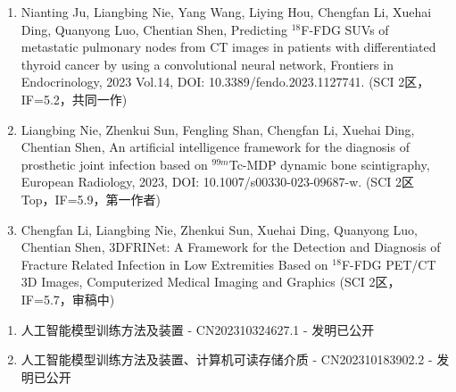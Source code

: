 \begin{publications}
    \begin{enumerate}
        \item Nianting Ju, Liangbing Nie, Yang Wang, Liying Hou, Chengfan Li, Xuehai Ding, Quanyong Luo, Chentian Shen, Predicting \(^{18}\)F-FDG SUVs of metastatic pulmonary nodes from CT images in patients with differentiated thyroid cancer by using a convolutional neural network, Frontiers in Endocrinology, 2023 Vol.14, DOI: 10.3389/fendo.2023.1127741. (SCI 2区，IF=5.2，共同一作)
        \item Liangbing Nie, Zhenkui Sun, Fengling Shan, Chengfan Li, Xuehai Ding, Chentian Shen, An artificial intelligence framework for the diagnosis of prosthetic joint infection based on \(^{99m}\)Tc-MDP dynamic bone scintigraphy, European Radiology, 2023, DOI: 10.1007/s00330-023-09687-w. (SCI 2区 Top，IF=5.9，第一作者)
        \item Chengfan Li, Liangbing Nie, Zhenkui Sun, Xuehai Ding, Quanyong Luo, Chentian Shen, 3DFRINet: A Framework for the Detection and Diagnosis of Fracture Related Infection in Low Extremities Based on \(^{18}\)F-FDG PET/CT 3D Images, Computerized Medical Imaging and Graphics (SCI 2区，IF=5.7，审稿中)
    \end{enumerate}

    \begin{enumerate}
        \item 人工智能模型训练方法及装置 - CN202310324627.1 - 发明已公开
        \item 人工智能模型训练方法及装置、计算机可读存储介质 - CN202310183902.2 - 发明已公开
    \end{enumerate}
\end{publications}